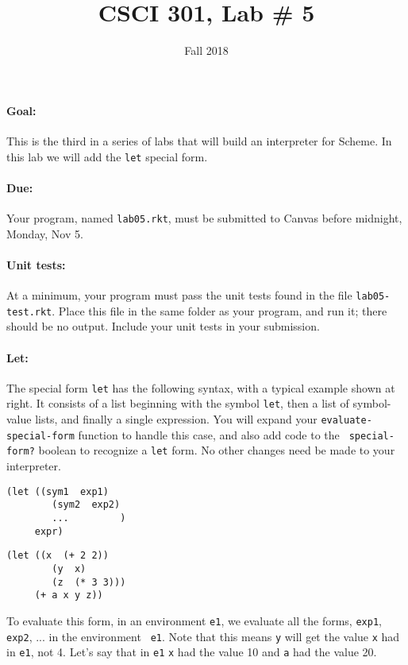 \documentclass{article}
\title{CSCI 301, Lab \# 5}
\author{Fall 2018}
\date{}
\begin{document}
\maketitle


\paragraph{Goal:} This is the third in a series of labs that will
build an interpreter for Scheme.  In this lab we will add the {\tt let}
special form.

\paragraph{Due:} Your program, named {\tt lab05.rkt}, must be submitted to
Canvas before midnight, Monday, Nov 5.

\paragraph{Unit tests:}
At a minimum, your program must pass the unit tests found in the
file {\tt lab05-test.rkt}.  Place this file in the same folder
as your program, and run it;  there should be no output.  Include
your unit tests in your submission.

\paragraph{Let:}

The special form {\tt let} has the following syntax, with a typical
example shown at right.  It consists of a list beginning with the
symbol {\tt let}, then a list of symbol-value lists, and finally a
single expression.  You will expand your {\tt evaluate-special-form}
function to handle this case, and also add code to the {\tt
  special-form?} boolean to recognize a {\tt let} form.  No other
changes need be made to your interpreter.
\begin{multicols}{2}
\begin{Verbatim}[frame=single]
  (let ((sym1  exp1)
        (sym2  exp2)
        ...         )
     expr)
\end{Verbatim}
\begin{Verbatim}[frame=single]
  (let ((x  (+ 2 2))
        (y  x)
        (z  (* 3 3)))
     (+ a x y z))
\end{Verbatim}
\end{multicols}
To evaluate this form, in an environment {\tt e1}, we evaluate
all the forms, {\tt exp1}, {\tt exp2}, ... in the environment {\tt
  e1}.   Note that this means {\tt y} will get the value {\tt x} had
in {\tt e1}, not 4.  Let's say that in {\tt e1} {\tt x} had the value
10 and {\tt a} had the value 20.
\end{document}
